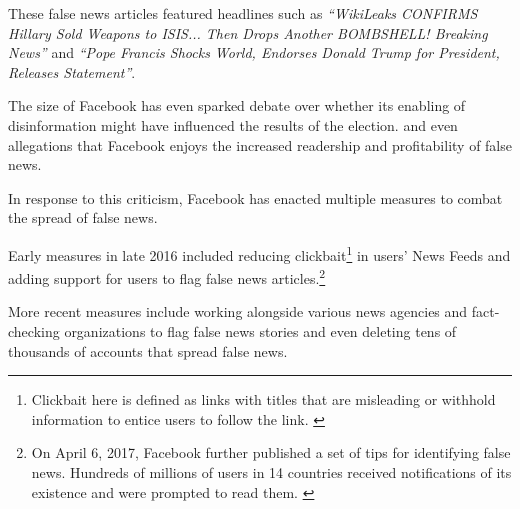 \par These false news articles featured headlines such as
\emph{``WikiLeaks CONFIRMS Hillary Sold Weapons to ISIS... Then Drops Another BOMBSHELL! Breaking News''} and
\emph{``Pope Francis Shocks World, Endorses Donald Trump for President, Releases Statement''}. \cite{buzzfeed_news_analysis}

\par The size of Facebook has even sparked debate over whether its enabling of disinformation might have influenced the results of the election. \cite{bbc_facebook_fake_news_crisis, wp_russian_election_propaganda} and even allegations that Facebook enjoys the increased readership and profitability of false news. \cite{tc_facebook_responsibility}

\par In response to this criticism, Facebook has enacted multiple measures to combat the spread of false news.

\par Early measures in late 2016 included reducing clickbait\footnote{Clickbait here is defined as links with titles that are misleading or withhold information to entice users to follow the link. \cite{fb_reduce_clickbait}} in users' News Feeds \cite{fb_reduce_clickbait} and adding support for users to flag false news articles.\footnote{On April 6, 2017, Facebook further published a set of tips for identifying false news. Hundreds of millions of users in 14 countries received notifications of its existence and were prompted to read them. \cite{fb_spot_fake_news,guardian_fb_tips}} \cite{fb_addressing_hoaxes,tc_fb_down_ranks_fake_news} 

\par More recent measures include working alongside various news agencies and fact-checking organizations to flag false news stories \cite{guardian_steps} and even deleting tens of thousands of accounts that spread false news. \cite{telegraph_fb_delete}